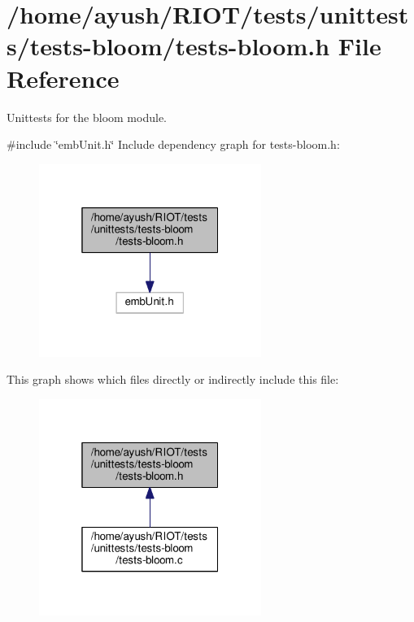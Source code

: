 \hypertarget{tests-bloom_8h}{}\section{/home/ayush/\+R\+I\+O\+T/tests/unittests/tests-\/bloom/tests-\/bloom.h File Reference}
\label{tests-bloom_8h}


Unittests for the {\ttfamily bloom} module.  


{\ttfamily \#include \char`\"{}emb\+Unit.\+h\char`\"{}}\newline
Include dependency graph for tests-\/bloom.h\+:
\nopagebreak
\begin{figure}[H]
\begin{center}
\leavevmode
\includegraphics[width=205pt]{tests-bloom_8h__incl}
\end{center}
\end{figure}
This graph shows which files directly or indirectly include this file\+:
\nopagebreak
\begin{figure}[H]
\begin{center}
\leavevmode
\includegraphics[width=205pt]{tests-bloom_8h__dep__incl}
\end{center}
\end{figure}
